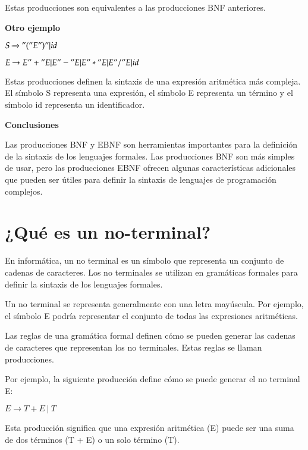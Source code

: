 Estas producciones son equivalentes a las producciones BNF anteriores.

\phantom{text}

\noindent \textbf{Otro ejemplo}

\phantom{text}

\begin{center}
    $S \xrightarrow{} "(" E ")" | id$
    
    $E \xrightarrow{} E "+" E | E "-" E | E "*" E | E "/" E | id$
\end{center}

Estas producciones definen la sintaxis de una expresión aritmética más compleja. El símbolo S representa una expresión, el símbolo E representa un término y el símbolo id representa un identificador.

\textbf{Conclusiones}

Las producciones BNF y EBNF son herramientas importantes para la definición de la sintaxis de los lenguajes formales. Las producciones BNF son más simples de usar, pero las producciones EBNF ofrecen algunas características adicionales que pueden ser útiles para definir la sintaxis de lenguajes de programación complejos.





\section{¿Qué es un no-terminal?}

\noindent En informática, un no terminal es un símbolo que representa un conjunto de cadenas de caracteres. Los no terminales se utilizan en gramáticas formales para definir la sintaxis de los lenguajes formales.

Un no terminal se representa generalmente con una letra mayúscula. Por ejemplo, el símbolo E podría representar el conjunto de todas las expresiones aritméticas.

Las reglas de una gramática formal definen cómo se pueden generar las cadenas de caracteres que representan los no terminales. Estas reglas se llaman producciones.

Por ejemplo, la siguiente producción define cómo se puede generar el no terminal E:

\begin{center}
    $E \xrightarrow{} T + E\: |\: T$
\end{center}

Esta producción significa que una expresión aritmética (E) puede ser una suma de dos términos (T + E) o un solo término (T).

